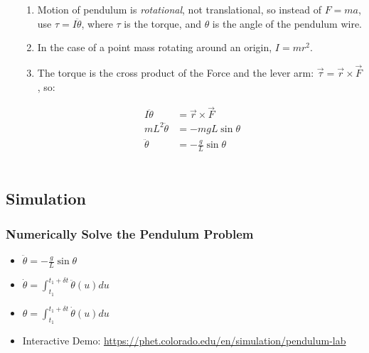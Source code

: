 \documentclass[pdf,hideothersubsections]{beamer}
\begin{document}
\begin{frame}
\begin{columns}[T]
\begin{column}{0.3\textwidth}
  \end{column}
\pause
  \begin{column}{0.7\textwidth}
  \begin{enumerate}
  \item Motion of pendulum is \emph{rotational}, not translational, so instead of $F = m a$, use $\tau = I \ddot{\theta}$, where $\tau$ is the torque, and $\theta$ is the angle of the pendulum wire. \\
    \pause
  \item In the case of a point mass rotating around an origin, $I = m r^2$. \\
    \pause
  \item The torque is the cross product of the Force and the lever arm: $\vec{\tau} = \vec{r} \times \vec{F}$, so: \\
  \end{enumerate}
  \pause
  \begin{align*}
I \ddot{\theta} &= \vec{r} \times \vec{F} \\
m L^2 \ddot{\theta} &= -m g L \sin{\theta} \\
\ddot{\theta} &= -\frac{g}{L} \sin{\theta} \\
  \end{align*}
  \end{column}

\end{columns}

\end{frame}
\subsection{Simulation}
\begin{frame}
\frametitle{Numerically Solve the Pendulum Problem}
\begin{itemize}
\item $\ddot{\theta} = -\frac{g}{L} \sin{\theta}$
\pause
\item $\dot{\theta} = \int_{t_1}^{t_1 + \delta t} \ddot{\theta}(u) du $
\pause
\item $\theta = \int_{t_1}^{t_1 + \delta t} \dot{\theta}(u) du $
\pause
\item Interactive Demo: \url{https://phet.colorado.edu/en/simulation/pendulum-lab}
\end{itemize}
\end{frame}
\end{document}
